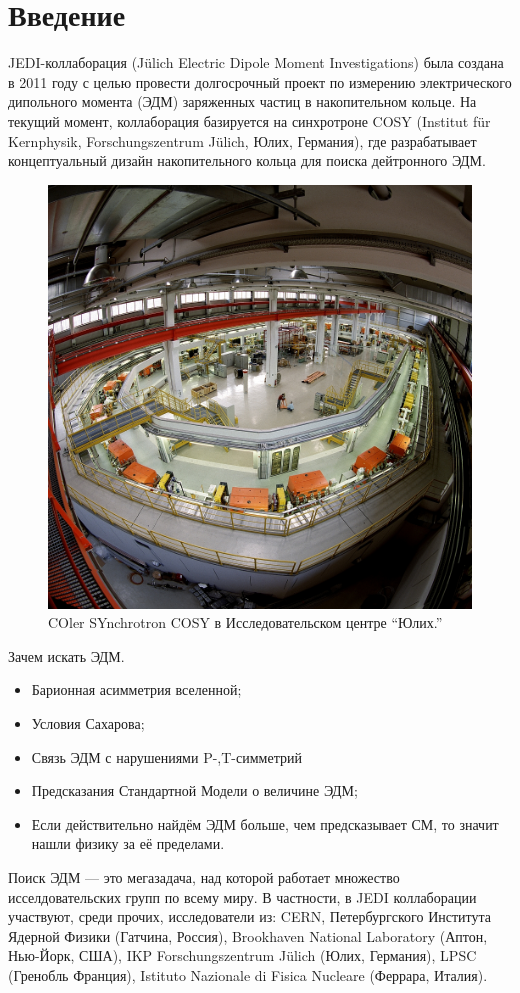 \documentclass{extarticle}
\begin{document}


\tableofcontents
\pagebreak

\section*{Введение}
JEDI-коллаборация (J\"ulich Electric Dipole Moment Investigations) была создана в 2011 году с целью провести долгосрочный проект по измерению электрического дипольного момента (ЭДМ) заряженных частиц в накопительном кольце. На текущий момент, коллаборация базируется на синхротроне COSY (Institut f\"ur Kernphysik, Forschungszentrum J\"ulich, Юлих, Германия), где разрабатывает концептуальный дизайн накопительного кольца для поиска дейтронного ЭДМ.

\begin{figure}
	\includegraphics{img/cosy_220}
	\caption{COler SYnchrotron COSY в Исследовательском центре ``Юлих.''}
\end{figure}

Зачем искать ЭДМ.
	\begin{itemize}
		\item Барионная асимметрия вселенной;
		\item Условия Сахарова;
		\item Связь ЭДМ с нарушениями P-,T-симметрий
		\item Предсказания Стандартной Модели о величине ЭДМ;
		\item Если действительно найдём ЭДМ больше, чем предсказывает СМ, то значит нашли физику за её пределами.
	\end{itemize}
Поиск ЭДМ --- это мегазадача, над которой работает множество исселдовательских групп по всему миру. В частности, в JEDI коллаборации участвуют, среди прочих, исследователи из: CERN, Петербургского Института Ядерной Физики (Гатчина, Россия), Brookhaven National Laboratory (Аптон, Нью-Йорк, США), IKP Forschungszentrum J\"ulich (Юлих, Германия), LPSC (Гренобль Франция), Istituto Nazionale di Fisica Nucleare (Феррара, Италия).~\cite{JEDI}
\end{document}
